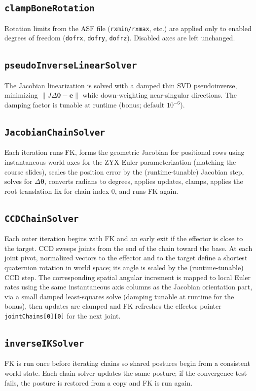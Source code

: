\documentclass[11pt,a4paper]{article}
\begin{document}
\subsection{\texttt{clampBoneRotation}}
Rotation limits from the ASF file (\texttt{rxmin/rxmax}, etc.) are applied only to enabled degrees of freedom
(\texttt{dofrx}, \texttt{dofry}, \texttt{dofrz}). Disabled axes are left unchanged.

\subsection{\texttt{pseudoInverseLinearSolver}}
The Jacobian linearization is solved with a damped thin SVD pseudoinverse, minimizing
$\lVert J\Delta\boldsymbol{\theta}-\mathbf{e}\rVert$ while down-weighting near-singular directions.
The damping factor is tunable at runtime (bonus; default $10^{-6}$).

\subsection{\texttt{JacobianChainSolver}}
Each iteration runs FK, forms the geometric Jacobian for positional rows using instantaneous world axes for
the ZYX Euler parameterization (matching the course slides), scales the position error by the (runtime-tunable)
Jacobian step, solves for $\Delta\boldsymbol{\theta}$, converts radians to degrees, applies updates, clamps,
applies the root translation fix for chain index $0$, and runs FK again.

\subsection{\texttt{CCDChainSolver}}
Each outer iteration begins with FK and an early exit if the effector is close to the target.
CCD sweeps joints from the end of the chain toward the base. At each joint pivot, normalized vectors to the
effector and to the target define a shortest quaternion rotation in world space; its angle is scaled by the
(runtime-tunable) CCD step. The corresponding spatial angular increment is mapped to local Euler rates using the
same instantaneous axis columns as the Jacobian orientation part, via a small damped least-squares solve
(damping tunable at runtime for the bonus), then updates are clamped and FK refreshes the effector pointer
\texttt{jointChains[0][0]} for the next joint.

\subsection{\texttt{inverseIKSolver}}
FK is run once before iterating chains so shared postures begin from a consistent world state. Each chain
solver updates the same posture; if the convergence test fails, the posture is restored from a copy and FK is
run again.
\end{document}
